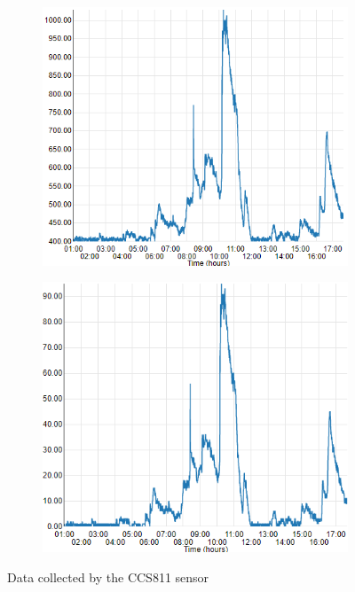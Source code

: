 \documentclass{article}      %
\begin{document}
\begin{figure}[ht]
\begin{subfigure}[c]{0.5\textwidth}
\includegraphics[width=1\textwidth]{expEval/eCO2_09-02-2018.PNG}
\label{fig:evalCO2}
\end{subfigure}
\begin{subfigure}[c]{0.5\textwidth}
\includegraphics[width=1\textwidth]{expEval/VOC_09-02-2018.PNG}
\label{fig:evalTVOC}
\end{subfigure}
\caption{Data collected by the CCS811 sensor}
\end{figure}
\end{document}
